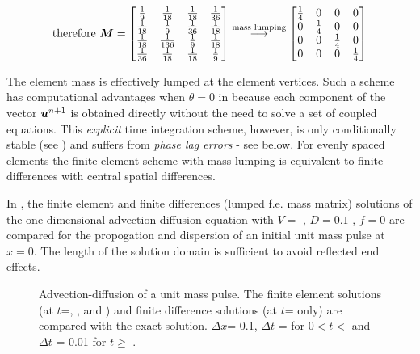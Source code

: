 \begin{displaymath}
  \text{therefore } \matr{M}=\begin{bmatrix}
    \frac{1}{9} & \frac{1}{18} & \frac{1}{18} & \frac{1}{36} \\
    \frac{1}{18} & \frac{1}{9} & \frac{1}{36} & \frac{1}{18} \\
    \frac{1}{18} & \frac{1}{136} & \frac{1}{9} & \frac{1}{18} \\
    \frac{1}{36} & \frac{1}{18} & \frac{1}{18} & \frac{1}{9} \\
  \end{bmatrix}
  \stackrel{\text{mass lumping}}{\longrightarrow} \begin{bmatrix}
    \frac{1}{4} & 0 & 0 & 0 \\
    0 & \frac{1}{4} & 0 & 0 \\
    0 & 0 & \frac{1}{4} & 0 \\
    0 & 0 & 0 & \frac{1}{4}
  \end{bmatrix}
\end{displaymath}

The element mass is effectively lumped at the element vertices.  Such a scheme
has computational advantages when $\theta = 0$ in 
because each component of the vector $\vect{u}^{n+1}$ is obtained directly
without the need to solve a set of coupled equations. This \emph{explicit}
time integration scheme, however, is only conditionally stable (see
) and suffers from \emph{phase lag errors} - see below. For
evenly spaced elements the finite element scheme with mass lumping is
equivalent to finite differences with central spatial differences.

In , the finite element and finite differences (lumped
f.e. mass matrix) solutions of the one-dimensional advection-diffusion
equation  with $V =$ , $D = 0.1$
, $f = 0$ are compared for the propogation and dispersion
of an initial unit mass pulse at $x = 0$. The length of the solution domain is
sufficient to avoid reflected end effects.
\begin{figure} \centering
 
 \caption{Advection-diffusion of a unit mass pulse. The finite element
   solutions (at $t$=, ,  and
   ) and finite difference solutions (at $t$=
   only) are compared with the exact solution.  $\Delta x$= 0.1, $\Delta t$ =
    for 0$<t<$ and $\Delta t$ = 0.01 for $t
   \geq$ .}
 \label{fig:advection}
\end{figure}


